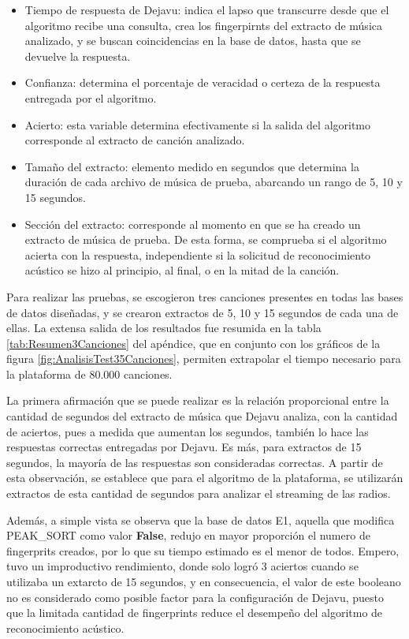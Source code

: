 \begin{itemize}
\item Tiempo de respuesta de Dejavu: indica el lapso que transcurre desde que el algoritmo recibe una consulta, crea los fingerpirnts del extracto de música analizado, y se buscan coincidencias en la base de datos, hasta que se devuelve la respuesta.

\item Confianza: determina el porcentaje de veracidad o certeza de la respuesta entregada por el algoritmo.

\item Acierto: esta variable determina efectivamente si la salida del algoritmo corresponde al extracto de canción analizado.

\item Tamaño del extracto: elemento medido en segundos que determina la duración de cada archivo de música de prueba, abarcando un rango de 5, 10 y 15 segundos.

\item Sección del extracto: corresponde al momento en que se ha creado un extracto de música de prueba. De esta forma, se comprueba si el algoritmo acierta con la respuesta, independiente si la solicitud de reconocimiento acústico se hizo al principio, al final, o en la mitad de la canción. 
\end{itemize}

Para realizar las pruebas, se escogieron tres canciones presentes en todas las bases de datos diseñadas, y se crearon extractos de 5, 10 y 15 segundos de cada una de ellas. La extensa salida de los resultados fue resumida en la tabla \ref{tab:Resumen3Canciones} del apéndice, que en conjunto con los gráficos de la figura \ref{fig:AnalisisTest35Canciones}, permiten extrapolar el tiempo necesario para la plataforma de 80.000 canciones. 

La primera afirmación que se puede realizar es la relación proporcional entre la cantidad de segundos del extracto de música que Dejavu analiza, con la cantidad de aciertos, pues a medida que aumentan los segundos, también lo hace las respuestas correctas entregadas por Dejavu. Es más, para extractos de 15 segundos, la mayoría de las respuestas son consideradas correctas. A partir de esta observación, se establece que para el algoritmo de la plataforma, se utilizarán extractos de esta cantidad de segundos para analizar el streaming de las radios.

Además, a simple vista se observa que la base de datos E1, aquella que modifica PEAK\_SORT como valor \textbf{False}, redujo en mayor proporción el numero de fingerprits creados, por lo que su tiempo estimado es el menor de todos. Empero, tuvo un improductivo rendimiento, donde solo logró 3 aciertos cuando se utilizaba un extarcto de 15 segundos, y en consecuencia, el valor de este booleano no es considerado como posible factor para la configuración de Dejavu, puesto que la limitada cantidad de fingerprints reduce el desempeño del algoritmo de reconocimiento acústico.


